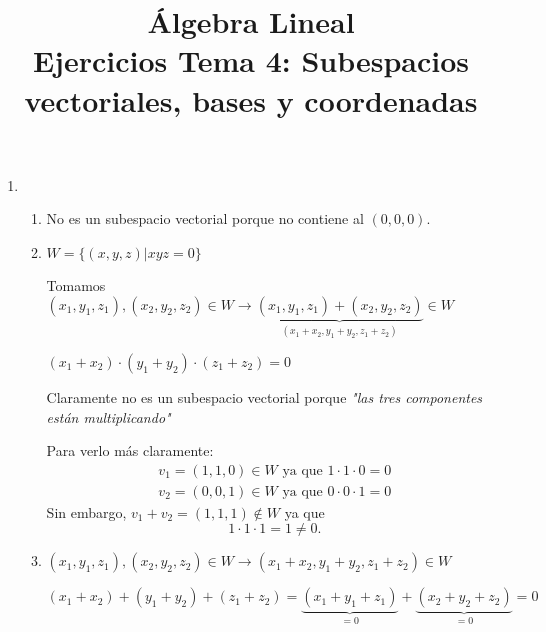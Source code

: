 
\renewcommand{\arraystretch}{1}
\setlength{\arraycolsep}{6pt}

\title{Álgebra Lineal\\Ejercicios Tema 4: Subespacios vectoriales, bases y coordenadas}


\maketitle
\begin{enumerate}[label=\color{red}\textbf{\arabic*)}]
    \item {}
        \begin{enumerate}[label=\color{red}\textbf{\alph*)}]
            \item {} 

                No es un subespacio vectorial porque no contiene al $(0,0,0)$.
            \item {} 

                $W=\{(x,y,z)|xyz=0\} $ 

                Tomamos $(x_1,y_1,z_1),(x_2,y_2,z_2)\in W\longrightarrow \underbrace{(x_1,y_1,z_1)+(x_2,y_2,z_2)}_{(x_1+x_2,y_1+y_2,z_1+z_2)}\in W$ 

                $(x_1+x_2)\cdot (y_1+y_2)\cdot (z_1+z_2)=0$

                Claramente no es un subespacio vectorial porque \textit{"las tres componentes  están multiplicando"} 

                Para verlo más claramente: \[
                \begin{array}{l}
                    v_1=(1,1,0)\in W\text{ ya que }1\cdot 1\cdot 0=0\\
                    v_2=(0,0,1)\in W\text{ ya que }0\cdot 0\cdot 1=0
                \end{array}
                \]
                Sin embargo, $v_1+v_2=(1,1,1)\notin W$ ya que \[
                1\cdot 1\cdot 1=1\neq 0.
                \] 
            \item {} 

                $(x_1,y_1,z_1),(x_2,y_2,z_2)\in W\longrightarrow (x_1+x_2,y_1+y_2,z_1+z_2)\in W$

                $(x_1+x_2)+(y_1+y_2)+(z_1+z_2)=\underbrace{(x_1+y_1+z_1)}_{=0}+\underbrace{(x_2+y_2+z_2)}_{=0}=0$


\end{enumerate}
\end{enumerate}
